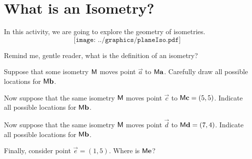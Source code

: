 \newpage
\section{What is an Isometry?}

In this activity, we are going to explore the geometry of isometries.
\[
\texttt{[image: ../graphics/planeIso.pdf]}
\]

\begin{prob}
Remind me, gentle reader, what is the definition of an isometry?
\end{prob}

\begin{prob}
Suppose that some isometry $\mathsf{M}$ moves point $\vec{a}$ to
$\mathsf{M}\mathbf{a}$. Carefully draw all possible locations for
$\mathsf{M}\mathbf{b}$.
\end{prob}

\begin{prob}
Now suppose that the same isometry $\mathsf{M}$ moves point $\vec{c}$ to
$\mathsf{M}\mathbf{c} = (5,5)$. Indicate all possible locations for
$\mathsf{M}\mathbf{b}$.
\end{prob}

\begin{prob}
Now suppose that the same isometry $\mathsf{M}$ moves point $\vec{d}$ to
$\mathsf{M}\mathbf{d} = (7,4)$. Indicate all possible locations for
$\mathsf{M}\mathbf{b}$.
\end{prob}



\begin{prob}
Finally, consider point $\vec{e} = (1,5)$. Where is $\mathsf{M}\mathbf{e}$?
\end{prob}

